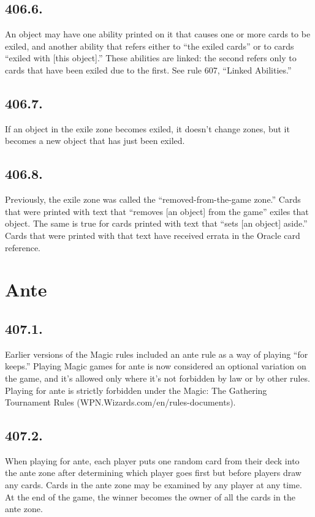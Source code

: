 \subsection*{406.6.}
An object may have one ability printed on it that causes one or more cards to be exiled, and another ability that refers either to “the exiled cards” or to cards “exiled with [this object].” These abilities are linked: the second refers only to cards that have been exiled due to the first. See rule 607, “Linked Abilities.”

\subsection*{406.7.}
If an object in the exile zone becomes exiled, it doesn’t change zones, but it becomes a new object that has just been exiled.

\subsection*{406.8.}
Previously, the exile zone was called the “removed-from-the-game zone.” Cards that were printed with text that “removes [an object] from the game” exiles that object. The same is true for cards printed with text that “sets [an object] aside.” Cards that were printed with that text have received errata in the Oracle card reference.

\section{Ante}
\subsection*{407.1.}
Earlier versions of the Magic rules included an ante rule as a way of playing “for keeps.” Playing Magic games for ante is now considered an optional variation on the game, and it’s allowed only where it’s not forbidden by law or by other rules. Playing for ante is strictly forbidden under the Magic: The Gathering Tournament Rules (WPN.Wizards.com/en/rules-documents).

\subsection*{407.2.}
When playing for ante, each player puts one random card from their deck into the ante zone after determining which player goes first but before players draw any cards. Cards in the ante zone may be examined by any player at any time. At the end of the game, the winner becomes the owner of all the cards in the ante zone.

